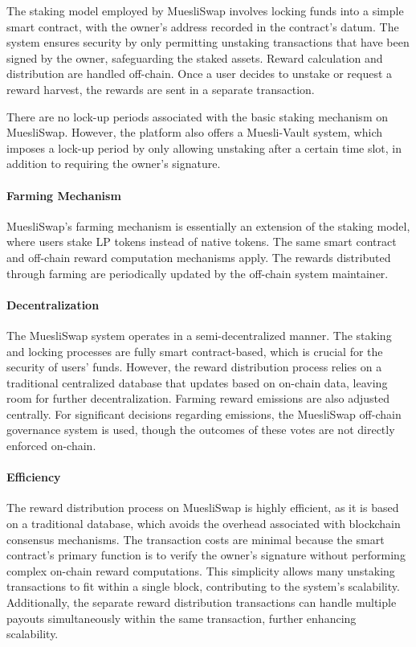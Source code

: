 \documentclass[12pt,parskip=full, tikz]{article}
\begin{document}
The staking model employed by MuesliSwap involves locking funds into a simple smart contract, with the owner's address recorded in the contract's datum. The system ensures security by only permitting unstaking transactions that have been signed by the owner, safeguarding the staked assets. Reward calculation and distribution are handled off-chain. Once a user decides to unstake or request a reward harvest, the rewards are sent in a separate transaction.

There are no lock-up periods associated with the basic staking mechanism on MuesliSwap. However, the platform also offers a Muesli-Vault system, which imposes a lock-up period by only allowing unstaking after a certain time slot, in addition to requiring the owner's signature.

\paragraph{Farming Mechanism}

MuesliSwap's farming mechanism is essentially an extension of the staking model, where users stake LP tokens instead of native tokens. The same smart contract and off-chain reward computation mechanisms apply. The rewards distributed through farming are periodically updated by the off-chain system maintainer.

\paragraph{Decentralization}

The MuesliSwap system operates in a semi-decentralized manner. The staking and locking processes are fully smart contract-based, which is crucial for the security of users' funds. However, the reward distribution process relies on a traditional centralized database that updates based on on-chain data, leaving room for further decentralization. Farming reward emissions are also adjusted centrally. For significant decisions regarding emissions, the MuesliSwap off-chain governance system is used, though the outcomes of these votes are not directly enforced on-chain.

\paragraph{Efficiency}

The reward distribution process on MuesliSwap is highly efficient, as it is based on a traditional database, which avoids the overhead associated with blockchain consensus mechanisms. The transaction costs are minimal because the smart contract's primary function is to verify the owner's signature without performing complex on-chain reward computations. This simplicity allows many unstaking transactions to fit within a single block, contributing to the system's scalability. Additionally, the separate reward distribution transactions can handle multiple payouts simultaneously within the same transaction, further enhancing scalability.
\end{document}
